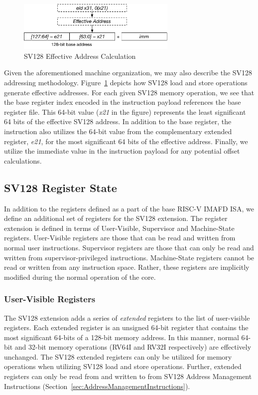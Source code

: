 \documentclass{article}
\begin{document}
\begin{figure}[h!]
\begin{center}
\includegraphics[width=3in]{figures/effectiveaddress.pdf}
\caption{SV128 Effective Address Calculation}
\label{fig:effectiveaddr}
\end{center}
\end{figure}

Given the aforementioned machine organization, we may also describe the SV128 addressing methodology.  
Figure~\ref{fig:effectiveaddr} depicts how SV128 load and store operations generate effective addresses.  For each 
given SV128 memory operation, we see that the base register index encoded in the instruction payload references 
the base register file.  This 64-bit value (\textit{x21} in the figure) represents the least significant 64 bits of the effective 
SV128 address.  In addition to the base register, the instruction also utilizes the 64-bit value from the complementary 
extended register, \textit{e21}, for the most significant 64 bits of the effective address.  Finally, we utilize the immediate 
value in the instruction payload for any potential offset calculations.

\subsection{SV128 Register State}
In addition to the registers defined as a part of the base RISC-V IMAFD ISA, we define an additional set of registers for the SV128 extension.  The register extension is defined in terms of User-Visible, Supervisor and Machine-State registers.  User-Visible registers are those that can be read and written from normal user instructions.  Supervisor registers are those that can only be read and written from supervisor-privileged instructions.  Machine-State registers cannot be read or written from any instruction space.  Rather, these registers are implicitly modified during the normal operation of the core.     

\subsubsection{User-Visible Registers} 
The SV128 extension adds a series of \emph{extended} registers to the list of user-visible registers.  Each extended register is an unsigned 64-bit register that contains the most significant 64-bits of a 128-bit memory address.  In this manner, normal 64-bit and 32-bit memory operations (RV64I and RV32I respectively) are effectively unchanged.  The SV128 extended registers can only be utilized for memory operations when utilizing SV128 load and store operations.  Further, extended registers can only be read from and written to from SV128 Address Management Instructions (Section~\ref{sec:AddressManagementInstructions}).   
\end{document}
